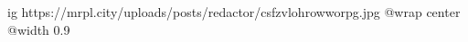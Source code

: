  
 
 
 
 

\ifcmt
  ig https://mrpl.city/uploads/posts/redactor/csfzvlohrowworpg.jpg
  @wrap center
  @width 0.9
\fi
